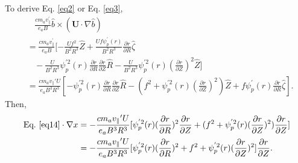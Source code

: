 \documentclass[12pt]{article}
\begin{document}
\begin{CJK*}{UTF8}{gbsn}
To derive Eq. \ref{eq2} or Eq. \ref{eq3}, 
\begin{equation}
\begin{split}
    &\ \ \ \  \frac{cm_av_{\parallel}^{'}}{e_aB} \hat{b} \times (\mathbf{U}\cdot\nabla\hat{b}) \\&= \frac{cm_av_{\parallel}^{'}}{e_aB}
    [-\frac{Uf^2}{B^2R^3}\hat{Z} + \frac{Uf\psi^{'}_p(r)}{B^2R^3}\frac{\partial r}{\partial R}\hat{\zeta}\\
     &\ \ \ \ -\frac{U}{B^2R^3}\psi_p^{'2}(r)\frac{\partial r}{\partial R}\frac{\partial r}{\partial Z}\hat{R}
     -\frac{U}{B^2R^3}\psi_p^{'2}(r)(\frac{\partial r}{\partial Z})^2\hat{Z}]\\
    &=\frac{cm_av_{\parallel}{'}U}{e_aB^3R^3}[-\psi_p^{'2}(r)\frac{\partial r}{\partial R}\frac{\partial r}{\partial Z}\hat{R}
     -(f^2 + \psi_p^{'2}(r)(\frac{\partial r}{\partial Z})^2)\hat{Z} + f\psi_p^{'}(r)\frac{\partial r}{\partial R}\hat{\zeta}].\label{eq14}
\end{split}
\end{equation}
Then, 
\begin{equation}
\begin{split}
    \textrm{Eq.}\ \ref{eq14} \cdot\nabla x &= -\frac{cm_av_{\parallel}{'}U}{e_aB^3R^3}[\psi_p^{'2}(r)(\frac{\partial r}{\partial R})^2\frac{\partial r}{\partial Z}
    +(f^2 + \psi_p^{'2}(r)(\frac{\partial r}{\partial Z})^2)\frac{\partial r}{\partial Z}]\\
    &= -\frac{cm_av_{\parallel}{'}U}{e_aB^3R^3}[\psi_p^{'2}(r)(\frac{\partial r}{\partial R})^2
       +f^2 + \psi_p^{'2}(r)(\frac{\partial r}{\partial Z})^2]\frac{\partial r}{\partial Z}.
\end{split}
\end{equation}


\end{CJK*}
\end{document}

